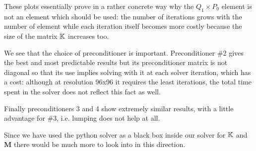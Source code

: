 These plots essentially prove in a rather concrete way why the $Q_1\times P_0$ element 
is not an element which should be used: the number of iterations grows with the 
number of element while each iteration itself becomes more costly because the size of the 
matrix ${\mathbb{K}}$ increases too.

We see that the choice of preconditioner is important. Preconditioner \#2 gives the best 
and most predictable results but its preconditioner matrix is not diagonal so that 
its use implies solving with it at each solver iteration, which has a cost: although at 
resolution 96x96 it requires the least iterations, the total time spent in the solver does
not reflect this fact as well. 

Finally preconditioners 3 and 4 show extremely similar results, with a little 
advantage for \#3, i.e. lumping does not help at all.

Since we have used the python solver as a black box inside our solver for ${\mathbb{K}}$ and ${\bm M}$
there would be much more to look into in this direction.







